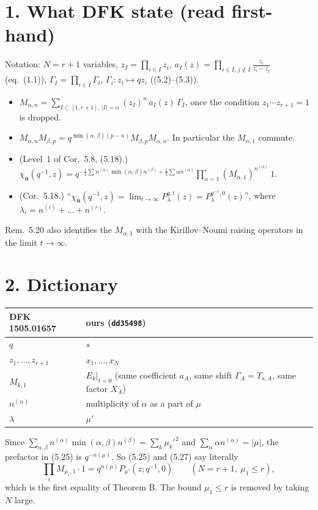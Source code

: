 \documentclass[10pt]{article}
\begin{document}
\section*{1. What DFK state (read first-hand)}
Notation: $N=r+1$ variables, $z_I=\prod_{i\in I}z_i$, $a_I(z)=\prod_{i\in I,\,j\notin I}\frac{z_i}{z_i-z_j}$ (eq.~(1.1)), $\Gamma_I=\prod_{i\in I}\Gamma_i$, $\Gamma_i:z_i\mapsto qz_i$ ((5.2)--(5.3)).
\begin{itemize}
\item[(5.15)] $M_{\alpha,n}=\sum_{I\subset[1,r+1],\,|I|=\alpha}(z_I)^n\,a_I(z)\,\Gamma_I$, once the condition $z_1\cdots z_{r+1}=1$ is dropped.
\item[(5.16)] $M_{\alpha,n}M_{\beta,p}=q^{\min(\alpha,\beta)(p-n)}M_{\beta,p}M_{\alpha,n}$. In particular the $M_{\alpha,1}$ commute.
\item[(5.25)] (Level~1 of Cor.~5.8, (5.18).) $\chi_{\mathbf n}(q^{-1},z)=q^{-\frac12\sum n^{(\alpha)}\min(\alpha,\beta)n^{(\beta)}+\frac12\sum\alpha n^{(\alpha)}}\prod_{\alpha=1}^r(M_{\alpha,1})^{n^{(\alpha)}}\,1$.
\item[(5.27)] (Cor.~5.18.) ``$\chi_{\mathbf n}(q^{-1},z)=\lim_{t\to\infty}P^{q,t}_\lambda(z)=P^{q^{-1},0}_\lambda(z)$'', where $\lambda_i=n^{(i)}+\dots+n^{(r)}$.
\end{itemize}
Rem.~5.20 also identifies the $M_{\alpha,1}$ with the Kirillov--Noumi raising operators in the limit $t\to\infty$.

\section*{2. Dictionary}
\begin{center}
\begin{tabular}{ll}
\toprule
DFK 1505.01657 & ours (\texttt{dd35498})\\
\midrule
$q$ & $s$\\
$z_1,\dots,z_{r+1}$ & $x_1,\dots,x_N$\\
$M_{k,1}$ & $E_k|_{t=0}$ (same coefficient $a_A$, same shift $\Gamma_A=T_{s,A}$, same factor $X_A$)\\
$n^{(\alpha)}$ & multiplicity of $\alpha$ as a part of $\mu$\\
$\lambda$ & $\mu'$\\
\bottomrule
\end{tabular}
\end{center}
Since $\sum_{\alpha,\beta}n^{(\alpha)}\min(\alpha,\beta)n^{(\beta)}=\sum_k\mu_k'^2$ and $\sum_\alpha\alpha n^{(\alpha)}=|\mu|$, the prefactor in (5.25) is $q^{-n(\mu)}$. So (5.25) and (5.27) say literally
\[
\prod_i M_{\mu_i,1}\cdot 1=q^{n(\mu)}P_{\mu'}(z;q^{-1},0)\qquad(N=r+1,\ \mu_1\le r),
\]
which is the first equality of Theorem B. The bound $\mu_1\le r$ is removed by taking $N$ large.
\end{document}
